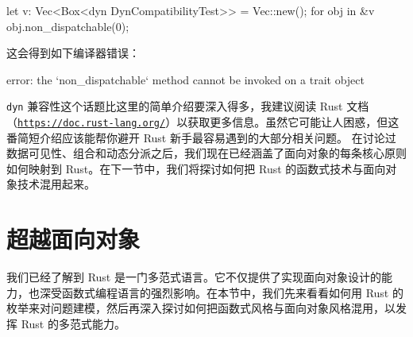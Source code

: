 \begin{codebox}[rust]
let v: Vec<Box<dyn DynCompatibilityTest>> = Vec::new();
for obj in &v {
      obj.non_dispatchable(0);
}
\end{codebox}
这会得到如下编译器错误：
\begin{codebox}[rust]
error: the `non_dispatchable` method cannot be invoked on a trait object
\end{codebox}
\texttt{dyn} 兼容性这个话题比这里的简单介绍要深入得多，我建议阅读 Rust 文档（\href{https://doc.rust-lang.org/}{\texttt{https:/\allowbreak{}/\allowbreak{}doc.\allowbreak{}rust-\allowbreak{}lang.\allowbreak{}org/\allowbreak{}}}）以获取更多信息。虽然它可能让人困惑，但这番简短介绍应该能帮你避开 Rust 新手最容易遇到的大部分相关问题。
\label{idx:idx_f4185a83}
在讨论过数据可见性、组合和动态分派之后，我们现在已经涵盖了面向对象的每条核心原则如何映射到 Rust。在下一节中，我们将探讨如何把 Rust 的函数式技术与面向对象技术混用起来。
\section{超越面向对象}
我们已经了解到 Rust 是一门多范式语言。它不仅提供了实现面向对象设计的能力，也深受函数式编程语言的强烈影响。在本节中，我们先来看看如何用 Rust 的枚举来对问题建模，然后再深入探讨如何把函数式风格与面向对象风格混用，以发挥 Rust 的多范式能力。
